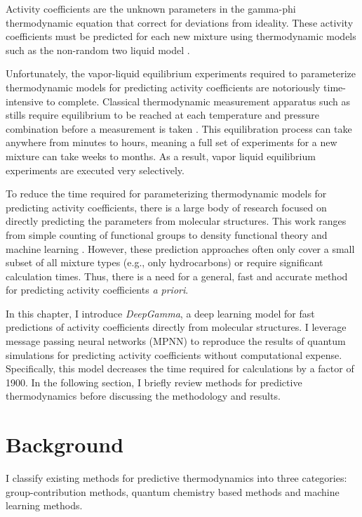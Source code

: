 Activity coefficients are the unknown parameters in the gamma-phi thermodynamic equation that correct for deviations from ideality. These activity coefficients must be predicted for each new mixture using thermodynamic models such as the non-random two liquid model \cite{Renon1968}. 

Unfortunately, the vapor-liquid equilibrium experiments required to parameterize thermodynamic models for predicting activity coefficients are notoriously time-intensive to complete. Classical thermodynamic measurement apparatus such as stills require equilibrium to be reached at each temperature and pressure combination before a measurement is taken \cite{Ronc1976, Dechambre2014}. This equilibration process can take anywhere from minutes to hours, meaning a full set of experiments for a new mixture can take weeks to months. As a result, vapor liquid equilibrium experiments are executed very selectively.

To reduce the time required for parameterizing thermodynamic models for predicting activity coefficients, there is a large body of research focused on directly predicting the parameters from molecular structures. This work ranges from simple counting of functional groups \cite{Fredenslund1975} to density functional theory \cite{ Klamt2010} and machine learning \cite{Urata2002, Nami2011,  Jirasek2020}.  However, these prediction approaches often only cover a small subset of all mixture types (e.g., only hydrocarbons) or require significant calculation times. Thus, there is a need for a general, fast and accurate method for predicting activity coefficients \textit{a priori}.

In this chapter, I introduce \textit{DeepGamma}, a deep learning model for fast predictions of activity coefficients directly from molecular structures.  I leverage message passing neural networks (MPNN) to reproduce the results of quantum simulations for predicting activity coefficients without computational expense. Specifically, this model decreases the time required for calculations by a factor of 1900. In the following section, I briefly review methods for predictive thermodynamics before discussing the methodology and results.

\section{Background}

I classify existing methods for predictive thermodynamics into three categories: group-contribution methods, quantum chemistry based methods and machine learning methods. 

